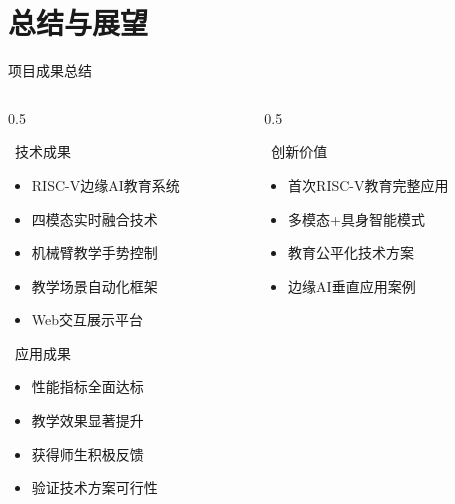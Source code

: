 \documentclass[aspectratio=169,12pt]{beamer}
\begin{document}
\section{总结与展望}

\begin{frame}{项目成果总结}
    \begin{columns}
        \begin{column}{0.5\textwidth}
            \begin{block}{\faCheckCircle\ 技术成果}
                \begin{itemize}
                    \item RISC-V边缘AI教育系统
                    \item 四模态实时融合技术
                    \item 机械臂教学手势控制
                    \item 教学场景自动化框架
                    \item Web交互展示平台
                \end{itemize}
            \end{block}
            
            \begin{block}{\faUsers\ 应用成果}
                \begin{itemize}
                    \item 性能指标全面达标
                    \item 教学效果显著提升
                    \item 获得师生积极反馈
                    \item 验证技术方案可行性
                \end{itemize}
            \end{block}
        \end{column}
        \begin{column}{0.5\textwidth}
            \begin{block}{\faLightbulb\ 创新价值}
                \begin{itemize}
                    \item 首次RISC-V教育完整应用
                    \item 多模态+具身智能模式
                    \item 教育公平化技术方案
                    \item 边缘AI垂直应用案例
                \end{itemize}
            \end{block}
            

\end{column}
\end{columns}
\end{frame}
\end{document}
